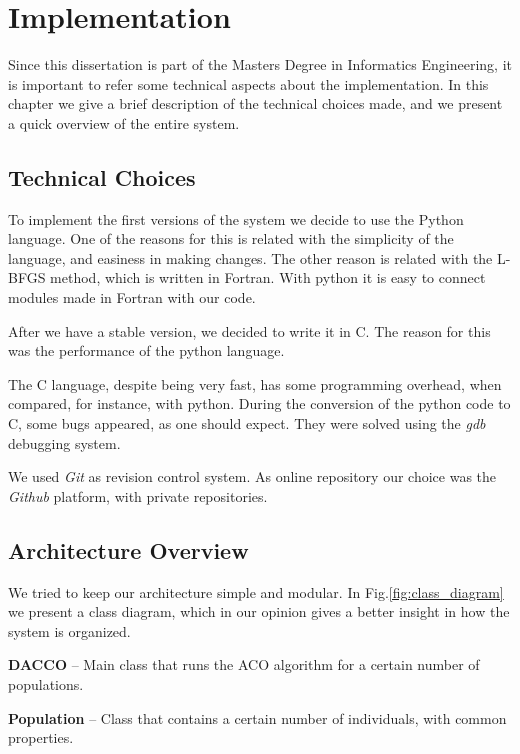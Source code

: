 \chapter{Implementation}
\label{chap:implementation}

Since this dissertation is part of the Masters Degree in Informatics Engineering, it is important to refer some technical aspects about the implementation. In this chapter we give a brief description of the technical choices made, and we present a quick overview of the entire system.

\section{Technical Choices}

To implement the first versions of the system we decide to use the Python language. One of the reasons for this is related with the simplicity of the language, and easiness in making changes. The other reason is related with the L-BFGS method, which is written in Fortran. With python it is easy to connect modules made in Fortran with our code.

After we have a stable version, we decided to write it in C. The reason for this was the performance of the python language. 

The C language, despite being very fast, has some programming overhead, when compared, for instance, with python. During the conversion of the python code to C, some bugs appeared, as one should expect. They were solved using the \emph{gdb} debugging system.

We used \emph{Git} as revision control system. As online repository our choice was the \emph{Github} platform, with private repositories.

\section{Architecture Overview}
We tried to keep our architecture simple and modular. In Fig.\ref{fig:class_diagram} we present a class diagram, which in our opinion gives a better insight in how the system is organized.

\pagebreak
\textbf{DACCO} – Main class that runs the ACO algorithm for a certain number of populations.

\textbf{Population} – Class that contains a certain number of individuals, with common properties.

